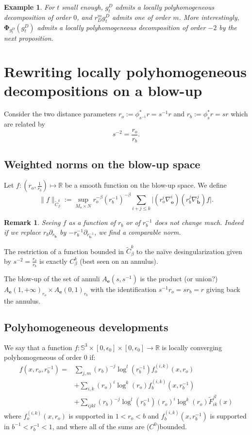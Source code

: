 \documentclass[12pt]{article}
\newtheorem{exmp}[thm]{Example}
\newtheorem{rem}[thm]{Remark}
\begin{document}
    \begin{exmp}
        For $t$ small enough, $g^D_t$ admits a locally polyhomogeneous decomposition of order $0$, and $r_D^{m}g^D_t$ admits one of order $m$. More interestingly, $\mathbf{\Phi}_{g^D_t}(g^D_t)$ admits a locally polyhomogeneous decomposition of order $-2$ by the next proposition.
    \end{exmp}
    
    
\section{Rewriting locally polyhomogeneous decompositions on a blow-up}
    
    Consider the two distance parameters $r_o:= \phi_{s^{-1}}^* r = s^{-1}r$ and $r_b:=\phi_{s}^* r= sr$ which are related by 
    $$ s^{-2} = \frac{r_o}{r_b}. $$
      
    
    \subsection{Weighted norms on the blow-up space}
    
    Let $f:(r_o,\frac{1}{r_b})\mapsto \mathbb{R}$ be a smooth function on the blow-up space. We define $$\|f\|_{\tilde{C}^{k}_{\beta}}:= \sup_{M_o\times N} r_o^{-\beta}(r_b^{-1})^{-\beta} \sum_{i+j\leqslant k}\big|(r_o^{i}\nabla_{\mathbf{o}}^i)(r_b^{j}\nabla_{\mathbf{b}}^j) f \big|.$$
    \begin{rem}
        Seeing $f$ as a function of $r_b$ or of $r_b^{-1}$ does not change much. Indeed if we replace $ r_b\partial_{r_\mathbf{b}}$ by $-r_b^{-1}\partial_{r_\mathbf{b}^{-1}}$, we find a comparable norm.
    \end{rem}
    The restriction of a function bounded in $\tilde{C}^{k}_{\beta}$ to the naïve desingularization given by $s^{-2} = \frac{r_o}{r_b}$ is exactly $ C^k_\beta $ (best seen on an annulus).
    
    The blow-up of the set of annuli $A_\mathbf{e}(s,s^{-1})$ is the product (or union?) $ A_\mathbf{e}(1,+\infty)_{r_o} \times A_\mathbf{e}(0,1)_{r_b}$ with the identification $ s^{-1} r_o = sr_b =r $ giving back the annulus.
    
    \subsection{Polyhomogeneous developments}
    
  We say that a function $f : \mathbb{S}^3 \times [0,\epsilon_0] \times [0,\epsilon_0] \to \mathbb{R}$ is locally converging polyhomogeneous of order $0$ if:
  \begin{align*}
      f(x,r_o,r_b^{-1}) =& \sum_{j,m} (r_b)^{-j}\log^l(r_b^{-1}) f_o^{(i,k)}(x,r_o)\\
      &+ \sum_{i,k}(r_o)^{i}\log^k(r_o) f_b^{(i,k)}(x,r_b^{-1}) \\
      &+ \sum_{ijkl} (r_b)^{-j}\log^l(r_b^{-1})(r_o)^{i}\log^k(r_o) \tilde{F}^{jl}_{ik}(x)
  \end{align*}
    where $ f_o^{(i,k)}(x,r_o)$ is supported in $1<r_o<b$ and $ f_b^{(i,k)}(x,r_b^{-1})$ is supported in $b^{-1}<r_b^{-1}<1$, and where all of the sums are ($C^0$)bounded.
    
\end{document}
